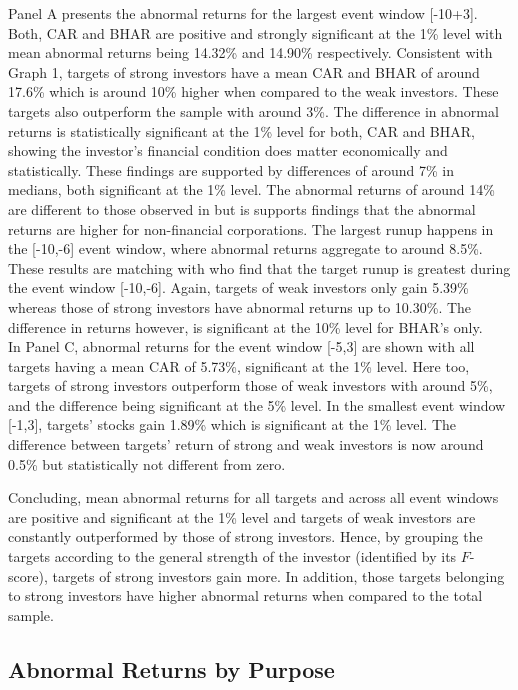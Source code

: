 \documentclass[12pt]{article}
\begin{document}
Panel A presents the abnormal returns for the largest event window [-10+3]. Both, CAR and BHAR are positive and strongly significant at the 1\% level with mean abnormal returns being 14.32\% and 14.90\% respectively. Consistent with Graph 1, targets of strong investors have a mean CAR and BHAR of around 17.6\% which is around 10\% higher when compared to the weak investors. These targets also outperform the sample with around 3\%. The difference in abnormal returns is statistically significant at the 1\% level for both, CAR and BHAR, showing the investor's financial condition does matter economically and statistically. These findings are supported by differences of around 7\% in medians, both significant at the 1\% level.
The abnormal returns of around 14\% are different to those observed in \citet[p.208]{Klein2009} but is supports \citet[p.29]{Brigida2012} findings that the abnormal returns are higher for non-financial corporations.
The largest runup happens in the [-10,-6] event window, where abnormal returns aggregate to around 8.5\%. These results are matching with \citet[p.32]{Brigida2012} who find that the target runup is greatest during the event window [-10,-6]. Again, targets of weak investors only gain 5.39\% whereas those of strong investors have abnormal returns up to 10.30\%. The difference in returns however, is significant at the 10\% level for BHAR's only.\\
In Panel C, abnormal returns for the event window [-5,3] are shown with all targets having a mean CAR of 5.73\%, significant at the 1\% level. Here too, targets of strong investors outperform those of weak investors with around 5\%, and the difference being significant at the 5\% level. 
In the smallest event window [-1,3], targets' stocks gain 1.89\% which is significant at the 1\% level. The difference between targets' return of strong and weak investors is now around 0.5\% but statistically not different from zero. 

Concluding, mean abnormal returns for all targets and across all event windows are positive and significant at the 1\% level and targets of weak investors are constantly outperformed by those of strong investors. Hence, by grouping the targets according to the general strength of the investor (identified by its $F$-score), targets of strong investors gain more. In addition, those targets belonging to strong investors have higher abnormal returns when compared to the total sample. 

\pagebreak

\subsection{Abnormal Returns by Purpose}
\end{document}
